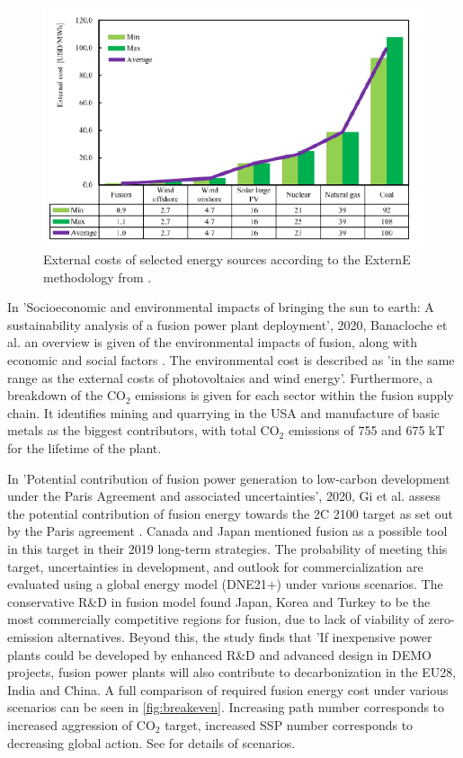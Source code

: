 \begin{figure}[h!]
    \centering
    \includegraphics[width =0.65\linewidth]{SubreportFigures/externE_comp.pdf}
    \caption{ External costs of selected energy sources according to the ExternE methodology from \cite{entler2018approximation}.}
    \label{fig:externE}
\end{figure}

In 'Socioeconomic and environmental impacts of bringing the sun to earth: A
sustainability analysis of a fusion power plant deployment', 2020, Banacloche et al. an overview is given of the environmental impacts of fusion, along with economic and social factors \cite{banacloche2020socioeconomic}. The environmental cost is described as 'in the same range as the external costs of photovoltaics and wind energy'. Furthermore, a breakdown of the CO$_2$ emissions is given for each sector within the fusion supply chain. It identifies mining and quarrying in the USA and manufacture of basic metals as the biggest contributors, with total CO$_2$ emissions of 755 and 675 kT for the lifetime of the plant.

In 'Potential contribution of fusion power generation to low-carbon development under the Paris Agreement and associated uncertainties', 2020, Gi et al. assess the potential contribution of fusion energy towards the 2\degree C 2100 target as set out by the Paris agreement \cite{gi2020potential}. Canada and Japan mentioned fusion as a possible tool in this target in their 2019 long-term strategies. The probability of meeting this target, uncertainties in development, and outlook for commercialization are evaluated using a global energy model (DNE21$+$) under various scenarios. The conservative R\&D in fusion model found Japan, Korea and Turkey to be the most commercially competitive regions for fusion, due to lack of viability of zero-emission alternatives. Beyond this, the study finds that 'If inexpensive power plants could be developed by enhanced R\&D and advanced design in DEMO projects, fusion power plants will also contribute to decarbonization in the EU28, India and China. A full comparison of required fusion energy cost under various scenarios can be seen in \ref{fig:breakeven}. Increasing path number corresponds to increased aggression of CO$_2$ target, increased SSP number corresponds to decreasing global action. See \cite{gi2020potential} for details of scenarios.


